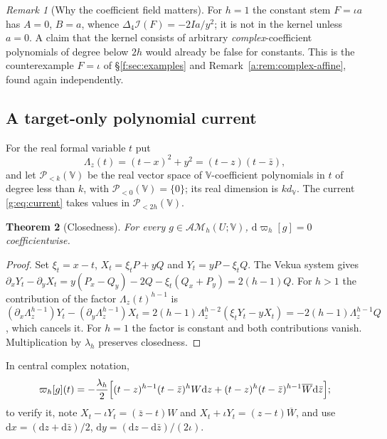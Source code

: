 \documentclass[11pt,a4paper]{article}
\numberwithin{equation}{section}
\newtheorem{theorem}{Theorem}[section]
\theoremstyle{definition}
\theoremstyle{remark}
\newtheorem{remark}[theorem]{Remark}
\theoremstyle{plain}
\newcommand{\lap}{\Delta_4}
\newcommand{\I}{\mathcal I}
\newcommand{\AM}{\mathcal{AM}}
\newcommand{\dd}{\mathrm d}
\newcommand{\VV}{\mathbb V}                       %
\newcommand{\dV}{d_{\VV}}                         %
\newcommand{\Pol}[1]{\mathscr P_{<#1}(\VV)}       %
\newcommand{\PolH}{\mathscr P_{<2h}(\VV)}
\newcommand{\cur}{\varpi}                         %
\newcommand{\Rq}{\Lambda}                         %
\begin{document}
\begin{remark}[Why the coefficient field matters]
\label{g:rem:coefficient-field}
For $h=1$ the constant stem $F=\iota a$ has $A=0$, $B=a$, whence
$\lap\I(F)=-2Ia/y^2$; it is not in the kernel unless $a=0$. A claim that the
kernel consists of arbitrary \emph{complex}-coefficient polynomials of degree
below $2h$ would already be false for constants. This is the counterexample
$F=\iota$ of \S\ref{f:sec:examples} and Remark~\ref{a:rem:complex-affine},
found again independently.
\end{remark}

\subsection{A target-only polynomial current}
\label{g:sub:current}

For the real formal variable $t$ put
\begin{equation}\label{g:eq:node-quadratic}
 \Rq_z(t)=(t-x)^2+y^2=(t-z)(t-\bar z),
\end{equation}
and let $\Pol{k}$ be the real vector space of $\VV$-coefficient polynomials in
$t$ of degree less than $k$, with $\Pol0=\{0\}$; its real dimension is
$k\dV$. The current \eqref{g:eq:current} takes values in $\PolH$.

\begin{theorem}[Closedness]
\label{g:thm:closed}
For every $g\in\AM_h(U;\VV)$, $\dd\cur_h[g]=0$ coefficientwise.
\end{theorem}

\begin{proof}
Set $\xi_t=x-t$, $X_t=\xi_tP+yQ$ and $Y_t=yP-\xi_tQ$. The Vekua system gives
$\partial_xY_t-\partial_yX_t=y(P_x-Q_y)-2Q-\xi_t(Q_x+P_y)=2(h-1)Q$. For $h>1$
the contribution of the factor $\Rq_z(t)^{h-1}$ is
$(\partial_x\Rq_z^{h-1})Y_t-(\partial_y\Rq_z^{h-1})X_t
=2(h-1)\Rq_z^{h-2}(\xi_tY_t-yX_t)=-2(h-1)\Rq_z^{h-1}Q$, which cancels it. For
$h=1$ the factor is constant and both contributions vanish. Multiplication by
$\lambda_h$ preserves closedness.
\end{proof}

In central complex notation,
\begin{equation}\label{g:eq:complex-current}
 \cur_h[g](t)=-\frac{\lambda_h}{2}\Bigl[(t-z)^{h-1}(t-\bar z)^hW\dd z
 +(t-z)^h(t-\bar z)^{h-1}\overline W\dd\bar z\Bigr];
\end{equation}
to verify it, note $X_t-\iota Y_t=(\bar z-t)W$ and $X_t+\iota Y_t=(z-t)\overline W$,
and use $\dd x=(\dd z+\dd\bar z)/2$, $\dd y=(\dd z-\dd\bar z)/(2\iota)$.
\end{document}
